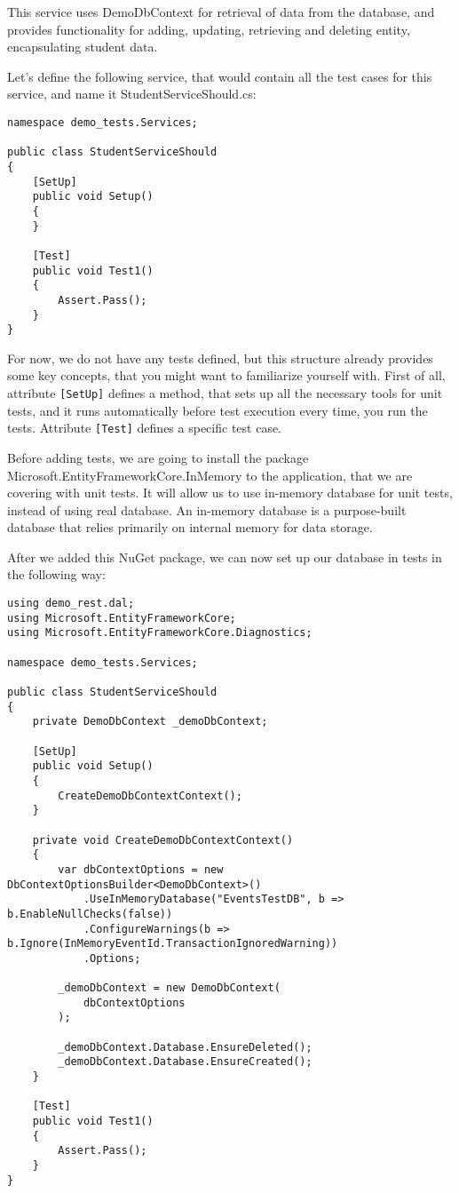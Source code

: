 This service uses DemoDbContext for retrieval of data from the database, and provides functionality for adding, updating, retrieving and deleting entity, encapsulating student data.

Let's define the following service, that would contain all the test cases for this service, and name it StudentServiceShould.cs:

\begin{lstlisting}
namespace demo_tests.Services;

public class StudentServiceShould
{
    [SetUp]
    public void Setup()
    {
    }

    [Test]
    public void Test1()
    {
        Assert.Pass();
    }
}

\end{lstlisting}

For now, we do not have any tests defined, but this structure already provides some key concepts, that you might want to familiarize yourself with. First of all, attribute \lstinline{[SetUp]} defines a method, that sets up all the necessary tools for unit tests, and it runs automatically before test execution every time, you run the tests. Attribute \lstinline{[Test]} defines a specific test case.

Before adding tests, we are going to install the package Microsoft.EntityFrameworkCore.InMemory to the application, that we are covering with unit tests. It will allow us to use in-memory database for unit tests, instead of using real database. An in-memory database is a purpose-built database that relies primarily on internal memory for data storage.

After we added this NuGet package, we can now set up our database in tests in the following way:

\begin{lstlisting}
using demo_rest.dal;
using Microsoft.EntityFrameworkCore;
using Microsoft.EntityFrameworkCore.Diagnostics;

namespace demo_tests.Services;

public class StudentServiceShould
{
    private DemoDbContext _demoDbContext;

    [SetUp]
    public void Setup()
    {
        CreateDemoDbContextContext();
    }

    private void CreateDemoDbContextContext()
    {
        var dbContextOptions = new DbContextOptionsBuilder<DemoDbContext>()
            .UseInMemoryDatabase("EventsTestDB", b => b.EnableNullChecks(false))
            .ConfigureWarnings(b => b.Ignore(InMemoryEventId.TransactionIgnoredWarning))
            .Options;

        _demoDbContext = new DemoDbContext(
            dbContextOptions
        );

        _demoDbContext.Database.EnsureDeleted();
        _demoDbContext.Database.EnsureCreated();
    }

    [Test]
    public void Test1()
    {
        Assert.Pass();
    }
}

\end{lstlisting}

